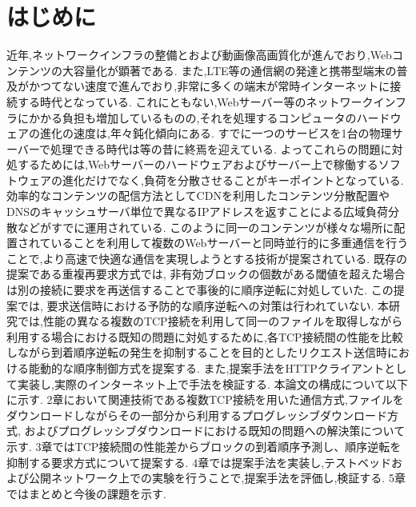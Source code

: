 \documentclass[a4j,12pt]{gradthesis_utf8}
\begin{document}
 
\maketitle %

\chapter{はじめに}\label{sec:sec1}
近年,ネットワークインフラの整備とおよび動画像高画質化が進んでおり,Webコンテンツの大容量化が顕著である.
また,LTE等の通信網の発達と携帯型端末の普及がかつてない速度で進んでおり,非常に多くの端末が常時インターネットに接続する時代となっている.
これにともない,Webサーバー等のネットワークインフラにかかる負担も増加しているものの,それを処理するコンピュータのハードウェアの進化の速度は,年々鈍化傾向にある.
すでに一つのサービスを1台の物理サーバーで処理できる時代は等の昔に終焉を迎えている.
よってこれらの問題に対処するためには,Webサーバーのハードウェアおよびサーバー上で稼働するソフトウェアの進化だけでなく,負荷を分散させることがキーポイントとなっている.
効率的なコンテンツの配信方法としてCDNを利用したコンテンツ分散配置やDNSのキャッシュサーバ単位で異なるIPアドレスを返すことによる広域負荷分散などがすでに運用されている.
このように同一のコンテンツが様々な場所に配置されていることを利用して複数のWebサーバーと同時並行的に多重通信を行うことで,より高速で快適な通信を実現しようとする技術が提案されている.
既存の提案である重複再要求方式では, 
非有効ブロックの個数がある閾値を超えた場合は別の接続に要求を再送信することで事後的に順序逆転に対処していた.
この提案では, 要求送信時における予防的な順序逆転への対策は行われていない.
本研究では,性能の異なる複数のTCP接続を利用して同一のファイルを取得しながら利用する場合における既知の問題に対処するために,各TCP接続間の性能を比較しながら到着順序逆転の発生を抑制することを目的としたリクエスト送信時における能動的な順序制御方式を提案する.
また,提案手法をHTTPクライアントとして実装し,実際のインターネット上で手法を検証する.
本論文の構成について以下に示す.
2章において関連技術である複数TCP接続を用いた通信方式,ファイルをダウンロードしながらその一部分から利用するプログレッシブダウンロード方式, およびプログレッシブダウンロードにおける既知の問題への解決策について示す.
3章ではTCP接続間の性能差からブロックの到着順序予測し、順序逆転を抑制する要求方式について提案する.
4章では提案手法を実装し,テストベッドおよび公開ネットワーク上での実験を行うことで,提案手法を評価し,検証する.
5章ではまとめと今後の課題を示す.
\end{document}

